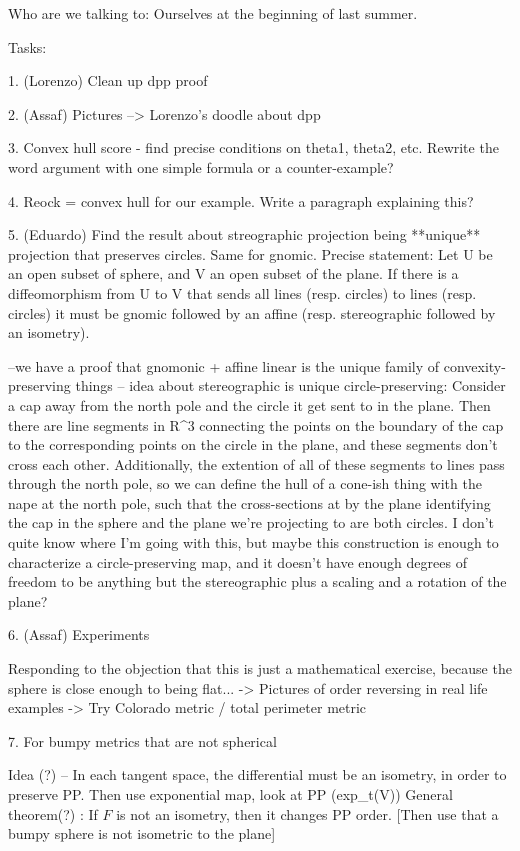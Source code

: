 Who are we talking to: Ourselves at the beginning of last summer.

Tasks:

1. (Lorenzo) Clean up dpp proof

2. (Assaf) Pictures
 --> Lorenzo's doodle about dpp

3. Convex hull score - find precise conditions on theta1, theta2, etc. Rewrite the word argument with one simple formula or a counter-example?

4. Reock = convex hull for our example. Write a paragraph explaining this?

5. (Eduardo) Find the result about streographic projection being **unique** projection that preserves circles. Same for gnomic.
Precise statement: Let U be an open subset of sphere, and V an open subset of the plane. If there is a diffeomorphism from U to V that sends all lines (resp. circles) to lines (resp. circles) it must be gnomic followed by an affine (resp. stereographic followed by an isometry).

--we have a proof that gnomonic + affine linear is the unique family of convexity-preserving things
-- idea about stereographic is unique circle-preserving: Consider a cap away from the north pole and the circle it get sent to in the plane.  Then there are line segments in R^3 connecting the points on the boundary of the cap to the corresponding points on the circle in the plane, and these segments don't cross each other.  Additionally, the extention of all of these segments to lines pass through the north pole, so we can define the hull of a cone-ish thing with the nape at the north pole, such that the cross-sections at by the plane identifying the cap in the sphere and the plane we're projecting to are both circles.  I don't quite know where I'm going with this, but maybe this construction is enough to characterize a circle-preserving map, and it doesn't have enough degrees of freedom to be anything but the stereographic plus a scaling and a rotation of the plane?

6. (Assaf) Experiments

Responding to the objection that this is just a mathematical exercise, because the sphere is close enough to being flat...
-> Pictures of order reversing in real life examples
-> Try Colorado metric / total perimeter metric

7. For bumpy metrics that are not spherical

Idea (?) -- In each tangent space, the differential must be an isometry, in order to preserve PP. Then use exponential map, look at PP (exp_t(V)) 
General theorem(?) : If $F$ is not an isometry, then it changes PP order.
[Then use that a bumpy sphere is not isometric to the plane]

